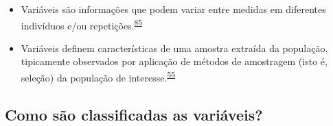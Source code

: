\documentclass[
  a4paper,
]{book}
\begin{document}
\begin{itemize}
\item
  Variáveis são informações que podem variar entre medidas em diferentes indivíduos e/ou repetições.\textsuperscript{\protect\hyperlink{ref-Altman1999}{85}}
\item
  Variáveis definem características de uma amostra extraída da população, tipicamente observados por aplicação de métodos de amostragem (isto é, seleção) da população de interesse.\textsuperscript{\protect\hyperlink{ref-vetter2017}{55}}
\end{itemize}

\hypertarget{como-suxe3o-classificadas-as-variuxe1veis}{%
\subsection{Como são classificadas as variáveis?}\label{como-suxe3o-classificadas-as-variuxe1veis}}
\end{document}

